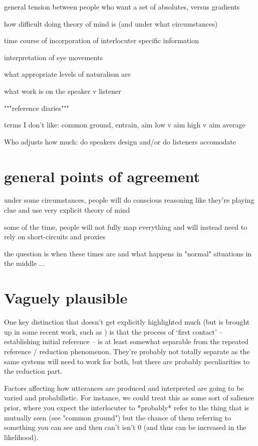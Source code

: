 \documentclass[]{article}
\begin{document}
general tension between people who want a set of absolutes, versus gradients

how difficult doing theory of mind is (and under what circumstances)

time course of incorporation of interlocuter specific information 

interpretation of eye movements

what appropriate levels of naturalism are

what work is on the speaker v listener

"""reference diaries"""

terms I don't like: common ground, entrain, aim low v aim high v aim average

Who adjusts how much: do speakers design and/or do listeners accomodate


\section{general points of agreement}

under some circumstances, people will do conscious reasoning like they're playing clue and use very explicit theory of mind 

some of the time, people will not fully map everything and will instead need to rely on short-circuits and proxies 

the question is when these times are and what happens in "normal" situations in the middle ... 


\section{Vaguely plausible}

One key distinction that doesn't get explicitly highlighted much (but is brought up in some recent work, such as \cite{leung2023}) is that the process of `first contact' -- establishing initial reference -- is at least somewhat separable from the repeated reference / reduction phenomenon. They're probably not totally separate as the same systems will need to work for both, but there are probably peculiarities to the reduction part. 

Factors affecting how utterances are produced and interpreted are going to be varied and probabilistic. For instance, we could treat this as some sort of salience prior, where you expect the interlocuter to *probably* refer to the thing that is mutually seen (see "common ground") but the chance of them referring to something you can see and then can't isn't 0 (and thus can be increased in the likelihood). 
\end{document}
